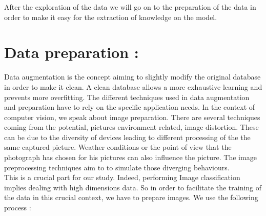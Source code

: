 \documentclass[a4paper]{article}
\begin{document}
After the exploration of the data we will go on to the preparation of the data in order to make it easy for the extraction of knowledge on the model.


\section{Data preparation :}

Data augmentation is the concept aiming to slightly modify the original database in order to make it clean. A clean database allows a more exhaustive learning and prevents more overfitting. The different techniques used in data augmentation and preparation have to rely on the specific application needs. In the context of computer vision, we speak about image preparation. There are several techniques coming from the potential, pictures environment related, image distortion. These can be due to the diversity of devices leading to different processing of the the same captured picture. Weather conditions or the point of view that the photograph has chosen for his pictures can also influence the picture. The image preprocessing techniques aim to to simulate those diverging behaviours. \\

This is a crucial part for our study. Indeed, performing Image classification implies dealing with high dimensions data. So in order to facilitate the training of the data in this crucial context, we have to prepare images. We use the following process :
\end{document}
